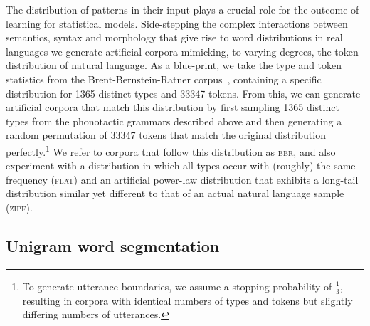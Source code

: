 \documentclass[11pt]{article}
\begin{document}
The distribution of patterns in their input plays a crucial role for the outcome of learning for statistical models. Side-stepping the complex interactions between semantics, syntax and morphology that give rise to word distributions in real languages we generate artificial corpora mimicking, to varying degrees, the token distribution of natural language. As a blue-print, we take the type and token statistics from the Brent-Bernstein-Ratner corpus~\cite{Brent99a}, containing a specific distribution for 1365 distinct types and 33347 tokens. From this, we can generate artificial corpora that match this distribution by first sampling 1365 distinct types from the phonotactic grammars described above and then generating a random permutation of 33347 tokens that match the original distribution perfectly.\footnote{To generate utterance boundaries, we assume a stopping probability of $\frac{1}{3}$, resulting in corpora with identical numbers of types and tokens but slightly differing numbers of utterances.} We refer to corpora that follow this distribution as \textsc{bbr}, and also experiment with a distribution in which all types occur with (roughly) the same frequency (\textsc{flat}) and an artificial power-law distribution that exhibits a long-tail distribution similar yet different to that of an actual natural language sample (\textsc{zipf}). 

\subsection{Unigram word segmentation}
\end{document}
